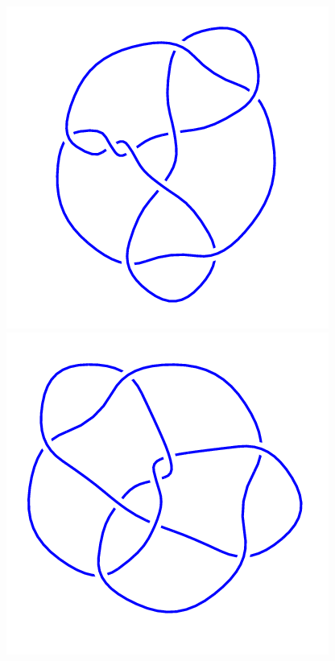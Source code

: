 \begin{figure}[H]
\begin{minipage}[b]{.18\linewidth}
	\end{minipage}
	\begin{minipage}[b]{.18\linewidth}
		\centering
		\includegraphics[width=\linewidth]{../data/9_48.png}
	\end{minipage}
	\begin{minipage}[b]{.18\linewidth}
		\centering
		\includegraphics[width=\linewidth]{../data/9_49.png}

\end{minipage}
\end{figure}
